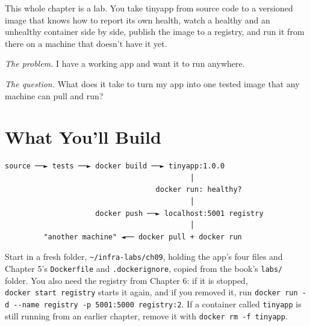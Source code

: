 
\begin{chapterintro}

This whole chapter is a lab. You take tinyapp from source code to a versioned image that knows how to report its own health, watch a healthy and an unhealthy container side by side, publish the image to a registry, and run it from there on a machine that doesn't have it yet.

\end{chapterintro}

\emph{The problem.} I have a working app and want it to run anywhere.

\emph{The question.} What does it take to turn my app into one tested image that any machine can pull and run?

\section{What You'll Build}\label{09-lab-ship-a-small-python-app-in-a-container:what-youll-build}

\begin{codeblock}
\begin{Verbatim}[breaklines=false, fontsize=\fontsize{8.8}{8.68}\selectfont, fontfamily=diagrammono, formatcom=\diagramlines]
 source ──► tests ──► docker build ──► tinyapp:1.0.0
                                           │
                                   docker run: healthy?
                                           │
                     docker push ──► localhost:5001 registry
                                           │
         "another machine" ◄── docker pull + docker run
\end{Verbatim}
\end{codeblock}

Start in a fresh folder, \texttt{\textasciitilde{}/infra-labs/ch09}, holding the app's four files and Chapter 5's \texttt{Dockerfile} and \texttt{.dockerignore}, copied from the book's \texttt{labs/} folder. You also need the registry from Chapter 6: if it is stopped, \texttt{docker\ start\ registry} starts it again, and if you removed it, run \texttt{docker\ run\ -}\allowbreak{}\texttt{d\ -}\allowbreak{}\texttt{-}\allowbreak{}\texttt{name\ registry\ -}\allowbreak{}\texttt{p\ 5001:}\allowbreak{}\texttt{5000\ registry:}\allowbreak{}\texttt{2}. If a container called \texttt{tinyapp} is still running from an earlier chapter, remove it with \texttt{docker\ rm\ -f\ tinyapp}.

